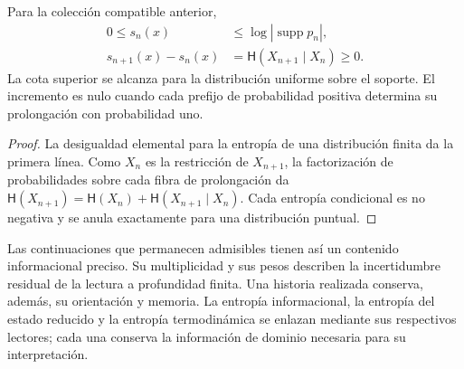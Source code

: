 \begin{proposition}
Para la colección compatible anterior,
\begin{align}
 0\leq s_n(x)&\leq\log|\operatorname{supp}p_n|,\\
 s_{n+1}(x)-s_n(x)
 &=\mathsf H(X_{n+1}\mid X_n)\geq0.
 \label{eq:ii-entropia-refinamiento}
\end{align}
La cota superior se alcanza para la distribución uniforme sobre el
soporte. El incremento es nulo cuando cada prefijo de probabilidad
positiva determina su prolongación con probabilidad uno.
\end{proposition}
\begin{proof}
La desigualdad elemental para la entropía de una distribución finita
da la primera línea. Como \(X_n\) es la restricción de \(X_{n+1}\),
la factorización de probabilidades sobre cada fibra de prolongación
da \(\mathsf H(X_{n+1})=\mathsf H(X_n)+
\mathsf H(X_{n+1}\mid X_n)\). Cada entropía condicional es no
negativa y se anula exactamente para una distribución puntual.
\end{proof}

Las continuaciones que permanecen admisibles tienen así un contenido
informacional preciso. Su multiplicidad y sus pesos describen la
incertidumbre residual de la lectura a profundidad finita. Una
historia realizada conserva, además, su orientación y memoria. La
entropía informacional, la entropía del estado reducido y la entropía
termodinámica se enlazan mediante sus respectivos lectores; cada una
conserva la información de dominio necesaria para su interpretación.
